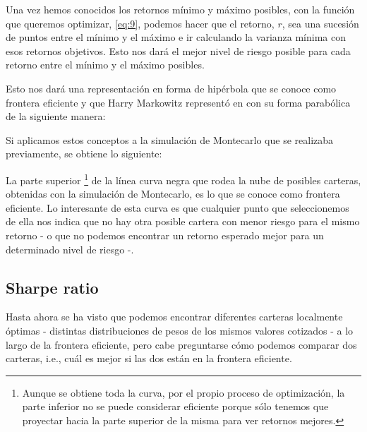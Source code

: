 Una vez hemos conocidos los retornos mínimo y máximo posibles, con la función que queremos optimizar, \ref{eq:9}, podemos hacer que el retorno, $r$, sea una sucesión de puntos entre el mínimo y el máximo e ir calculando la varianza mínima con esos retornos objetivos. Esto nos dará el mejor nivel de riesgo posible para cada retorno entre el mínimo y el máximo posibles. 

Esto nos dará una representación en forma de hipérbola que se conoce como frontera eficiente \citep{wiki:frontera_eficiente} y que Harry Markowitz representó en \citep{book:Portfolio_selection} con su forma parabólica de la siguiente manera:


Si aplicamos estos conceptos a la simulación de Montecarlo que se realizaba previamente, se obtiene lo siguiente:


La parte superior \footnote{Aunque se obtiene toda la curva, por el propio proceso de optimización, la parte inferior no se puede considerar eficiente porque sólo tenemos que proyectar hacia la parte superior de la misma para ver retornos mejores.} de la línea curva negra que rodea la nube de posibles carteras, obtenidas con la simulación de Montecarlo, es lo que se conoce como frontera eficiente. Lo interesante de esta curva es que cualquier punto que seleccionemos de ella nos indica que no hay otra posible cartera con menor riesgo para el mismo retorno - o que no podemos encontrar un retorno esperado mejor para un determinado nivel de riesgo -.


\subsection{Sharpe ratio}

Hasta ahora se ha visto que podemos encontrar diferentes carteras localmente óptimas - distintas distribuciones de pesos de los mismos valores cotizados - a lo largo de la frontera eficiente, pero cabe preguntarse cómo podemos comparar dos carteras, i.e., cuál es mejor si las dos están en la frontera eficiente.

